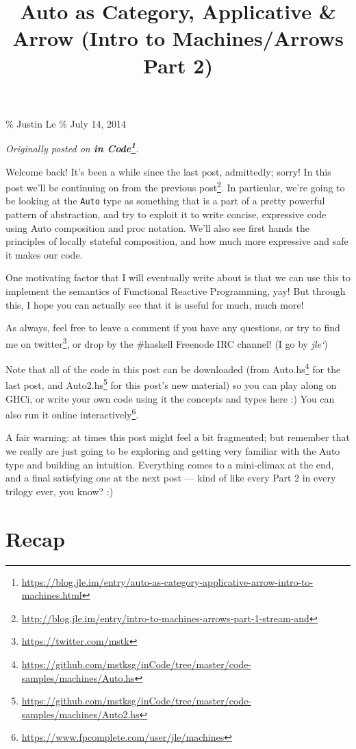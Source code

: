 \documentclass[]{article}
\title{Auto as Category, Applicative \& Arrow (Intro to Machines/Arrows Part 2)}
\renewcommand{\href}[2]{#2\footnote{\url{#1}}}
\begin{document}
\maketitle

\% Justin Le \% July 14, 2014

\emph{Originally posted on
\textbf{\href{https://blog.jle.im/entry/auto-as-category-applicative-arrow-intro-to-machines.html}{in
Code}}.}

Welcome back! It's been a while since the last post, admittedly; sorry! In this
post we'll be continuing on from
\href{http://blog.jle.im/entry/intro-to-machines-arrows-part-1-stream-and}{the
previous post}. In particular, we're going to be looking at the \texttt{Auto}
type as something that is a part of a pretty powerful pattern of abstraction,
and try to exploit it to write concise, expressive code using Auto composition
and proc notation. We'll also see first hands the principles of locally stateful
composition, and how much more expressive and safe it makes our code.

One motivating factor that I will eventually write about is that we can use this
to implement the semantics of Functional Reactive Programming, yay! But through
this, I hope you can actually see that it is useful for much, much more!

As always, feel free to leave a comment if you have any questions, or try to
find me on \href{https://twitter.com/mstk}{twitter}, or drop by the \#haskell
Freenode IRC channel! (I go by \emph{jle`})

Note that all of the code in this post can be downloaded (from
\href{https://github.com/mstksg/inCode/tree/master/code-samples/machines/Auto.hs}{Auto.hs}
for the last post, and
\href{https://github.com/mstksg/inCode/tree/master/code-samples/machines/Auto2.hs}{Auto2.hs}
for this post's new material) so you can play along on GHCi, or write your own
code using it the concepts and types here :) You can also run it
\href{https://www.fpcomplete.com/user/jle/machines}{online interactively}.

A fair warning: at times this post might feel a bit fragmented; but remember
that we really are just going to be exploring and getting very familiar with the
Auto type and building an intuition. Everything comes to a mini-climax at the
end, and a final satisfying one at the next post --- kind of like every Part 2
in every trilogy ever, you know? :)

\section{Recap}\label{recap}
\end{document}
